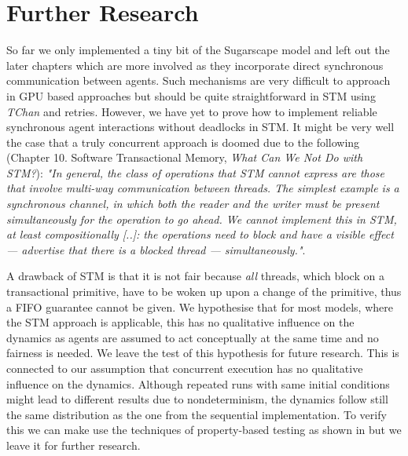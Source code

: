 \section{Further Research} %
\label{sec:further}

So far we only implemented a tiny bit of the Sugarscape model and left out the later chapters which are more involved as they incorporate direct synchronous communication between agents. Such mechanisms are very difficult to approach in GPU based approaches \cite{lysenko_framework_2008} but should be quite straightforward in STM using \textit{TChan} and retries. However, we have yet to prove how to implement reliable synchronous agent interactions without deadlocks in STM. It might be very well the case that a truly concurrent approach is doomed due to the following \cite{marlow_parallel_2013} (Chapter 10. Software Transactional Memory, \textit{What Can We Not Do with STM?}): \textit{"In general, the class of operations that STM cannot express are those that involve multi-way communication between threads. The simplest example is a synchronous channel, in which both the reader and the writer must be present simultaneously for the operation to go ahead. We cannot implement this in STM, at least compositionally [..]: the operations need to block and have a visible effect — advertise that there is a blocked thread — simultaneously."}. 

A drawback of STM is that it is not fair because \textit{all} threads, which block on a transactional primitive, have to be woken up upon a change of the primitive, thus a FIFO guarantee cannot be given. We hypothesise that for most models, where the STM approach is applicable, this has no qualitative influence on the dynamics as agents are assumed to act conceptually at the same time and no fairness is needed. We leave the test of this hypothesis for future research. This is connected to our assumption that concurrent execution has no qualitative influence on the dynamics. Although repeated runs with same initial conditions might lead to different results due to nondeterminism, the dynamics follow still the same distribution as the one from the sequential implementation. To verify this we can make use the techniques of property-based testing as shown in \cite{thaler_show_2019} but we leave it for further research.
